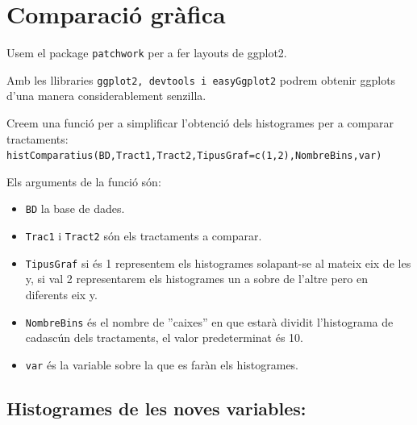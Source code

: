 \documentclass[11pt,a4paper]{article}\usepackage[]{graphicx}\usepackage[]{color}
\begin{document}
\section{Comparació gràfica}
Usem el package \texttt{patchwork} per a fer layouts de ggplot2.



Amb les llibraries \texttt{ggplot2, devtools i easyGgplot2} podrem obtenir ggplots d'una manera considerablement senzilla.



Creem una funció per a simplificar l'obtenció dels histogrames per a comparar tractaments:\\

\texttt{histComparatius(BD,Tract1,Tract2,TipusGraf=c(1,2),NombreBins,var)}

Els arguments de la funció són:

\begin{itemize}
  \item \texttt{BD} la base de dades.
  
  \item \texttt{Trac1} i \texttt{Tract2} són els tractaments a comparar.
  
  \item \texttt{TipusGraf} si és 1 representem els histogrames solapant-se al mateix eix de les y,
               si val 2 representarem els histogrames un a sobre de l'altre pero en diferents eix y.
               
  \item \texttt{NombreBins} és el nombre de ''caixes'' en que estarà dividit l'histograma de cadascún dels tractaments, el valor predeterminat és 10.
  
  \item \texttt{var} és la variable sobre la que es faràn els histogrames.
\end{itemize}



\subsection{Histogrames de les noves variables:}
\end{document}
